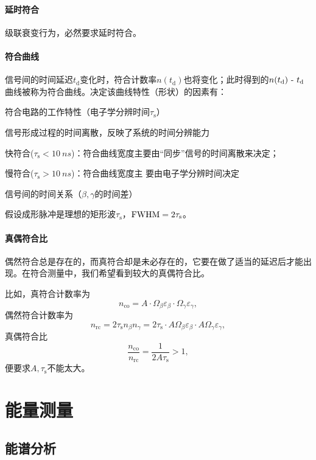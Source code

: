 \paragraph{延时符合}
级联衰变行为，必然要求延时符合。
\paragraph{符合曲线}
信号间的时间延迟$t_\mathrm d$变化时，符合计数率$n(t_\mathrm d)$也将变化；此时得到的$n(t_\mathrm d)~\text{-}~ t_\mathrm d$曲线被称为符合曲线。决定该曲线特性（形状）的因素有：
\begin{compactitem}
	\item 符合电路的工作特性（电子学分辨时间$\tau_\mathrm s$）
	\item 信号形成过程的时间离散，反映了系统的时间分辨能力
	\begin{compactitem}
		\item 快符合($\tau_\mathrm s<\SI{10}{ns}$)：符合曲线宽度主要由“同步”信号的时间离散来决定；
		\item 慢符合($\tau_\mathrm s>\SI{10}{ns}$)：符合曲线宽度主
		要由电子学分辨时间决定
	\end{compactitem}
	\item 信号间的时间关系（$\beta,\gamma$的时间差）
\end{compactitem}
假设成形脉冲是理想的矩形波$\tau_\mathrm s$，$\mathrm{FWHM}=2\tau_\mathrm s$。
\paragraph{真偶符合比}
偶然符合总是存在的，而真符合却是未必存在的，它要在做了适当的延迟后才能出现。在符合测量中，我们希望看到较大的真偶符合比。

比如，真符合计数率为
\[
	n_{\mathrm{co}}=A\cdot\Omega_\beta\varepsilon_\beta\cdot\Omega_\gamma\varepsilon_\gamma,
\]
偶然符合计数率为
\[
	n_{\mathrm{rc}}=2\tau_\mathrm s n_\beta n_\gamma=2\tau_\mathrm s\cdot A\Omega_\beta\varepsilon_\beta\cdot A\Omega_\gamma\varepsilon_\gamma,
\]
真偶符合比
\[
	\frac{n_{\mathrm{co}}}{n_{\mathrm{rc}}}=\frac1{2A\tau_\mathrm s}>1,
\]
便要求$A,\tau_\mathrm s$不能太大。

\section{能量测量}

\subsection{\textgamma 能谱分析}

